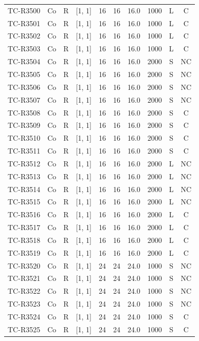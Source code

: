 \begin{longtable}{lccccccccc}
TC-R3500 & Co & R & [1, 1] & 16 & 16 & 16.0 & 1000 & L & C \\
TC-R3501 & Co & R & [1, 1] & 16 & 16 & 16.0 & 1000 & L & C \\
TC-R3502 & Co & R & [1, 1] & 16 & 16 & 16.0 & 1000 & L & C \\
TC-R3503 & Co & R & [1, 1] & 16 & 16 & 16.0 & 1000 & L & C \\
TC-R3504 & Co & R & [1, 1] & 16 & 16 & 16.0 & 2000 & S & NC \\
TC-R3505 & Co & R & [1, 1] & 16 & 16 & 16.0 & 2000 & S & NC \\
TC-R3506 & Co & R & [1, 1] & 16 & 16 & 16.0 & 2000 & S & NC \\
TC-R3507 & Co & R & [1, 1] & 16 & 16 & 16.0 & 2000 & S & NC \\
TC-R3508 & Co & R & [1, 1] & 16 & 16 & 16.0 & 2000 & S & C \\
TC-R3509 & Co & R & [1, 1] & 16 & 16 & 16.0 & 2000 & S & C \\
TC-R3510 & Co & R & [1, 1] & 16 & 16 & 16.0 & 2000 & S & C \\
TC-R3511 & Co & R & [1, 1] & 16 & 16 & 16.0 & 2000 & S & C \\
TC-R3512 & Co & R & [1, 1] & 16 & 16 & 16.0 & 2000 & L & NC \\
TC-R3513 & Co & R & [1, 1] & 16 & 16 & 16.0 & 2000 & L & NC \\
TC-R3514 & Co & R & [1, 1] & 16 & 16 & 16.0 & 2000 & L & NC \\
TC-R3515 & Co & R & [1, 1] & 16 & 16 & 16.0 & 2000 & L & NC \\
TC-R3516 & Co & R & [1, 1] & 16 & 16 & 16.0 & 2000 & L & C \\
TC-R3517 & Co & R & [1, 1] & 16 & 16 & 16.0 & 2000 & L & C \\
TC-R3518 & Co & R & [1, 1] & 16 & 16 & 16.0 & 2000 & L & C \\
TC-R3519 & Co & R & [1, 1] & 16 & 16 & 16.0 & 2000 & L & C \\
TC-R3520 & Co & R & [1, 1] & 24 & 24 & 24.0 & 1000 & S & NC \\
TC-R3521 & Co & R & [1, 1] & 24 & 24 & 24.0 & 1000 & S & NC \\
TC-R3522 & Co & R & [1, 1] & 24 & 24 & 24.0 & 1000 & S & NC \\
TC-R3523 & Co & R & [1, 1] & 24 & 24 & 24.0 & 1000 & S & NC \\
TC-R3524 & Co & R & [1, 1] & 24 & 24 & 24.0 & 1000 & S & C \\
TC-R3525 & Co & R & [1, 1] & 24 & 24 & 24.0 & 1000 & S & C \\

\end{longtable}
